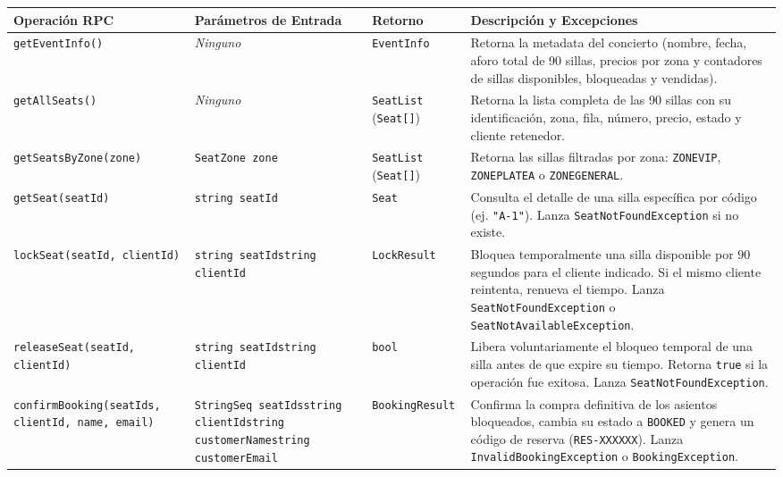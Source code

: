\documentclass[10pt,letterpaper]{article}
\begin{document}
\begin{center}
\scriptsize
\begin{tabularx}{\textwidth}{@{}|l|p{3.2cm}|l|X|@{}}
\hline
\rowcolor{icesiLight}
\textbf{Operación RPC} & \textbf{Parámetros de Entrada} & \textbf{Retorno} & \textbf{Descripción y Excepciones} \\
\hline
\texttt{getEventInfo()} & \textit{Ninguno} & \texttt{EventInfo} & Retorna la metadata del concierto (nombre, fecha, aforo total de 90 sillas, precios por zona y contadores de sillas disponibles, bloqueadas y vendidas). \\
\hline
\texttt{getAllSeats()} & \textit{Ninguno} & \texttt{SeatList} (\texttt{Seat[]}) & Retorna la lista completa de las 90 sillas con su identificación, zona, fila, número, precio, estado y cliente retenedor. \\
\hline
\texttt{getSeatsByZone(zone)} & \texttt{SeatZone zone} & \texttt{SeatList} (\texttt{Seat[]}) & Retorna las sillas filtradas por zona: \texttt{ZONEVIP}, \texttt{ZONEPLATEA} o \texttt{ZONEGENERAL}. \\
\hline
\texttt{getSeat(seatId)} & \texttt{string seatId} & \texttt{Seat} & Consulta el detalle de una silla específica por código (ej. \texttt{"A-1"}). Lanza \texttt{SeatNotFoundException} si no existe. \\
\hline
\texttt{lockSeat(seatId, clientId)} & \texttt{string seatId}\newline\texttt{string clientId} & \texttt{LockResult} & Bloquea temporalmente una silla disponible por 90 segundos para el cliente indicado. Si el mismo cliente reintenta, renueva el tiempo. Lanza \texttt{SeatNotFoundException} o \texttt{SeatNotAvailableException}. \\
\hline
\texttt{releaseSeat(seatId, clientId)} & \texttt{string seatId}\newline\texttt{string clientId} & \texttt{bool} & Libera voluntariamente el bloqueo temporal de una silla antes de que expire su tiempo. Retorna \texttt{true} si la operación fue exitosa. Lanza \texttt{SeatNotFoundException}. \\
\hline
\texttt{confirmBooking(seatIds, clientId, name, email)} & \texttt{StringSeq seatIds}\newline\texttt{string clientId}\newline\texttt{string customerName}\newline\texttt{string customerEmail} & \texttt{BookingResult} & Confirma la compra definitiva de los asientos bloqueados, cambia su estado a \texttt{BOOKED} y genera un código de reserva (\texttt{RES-XXXXXX}). Lanza \texttt{InvalidBookingException} o \texttt{BookingException}. \\

\end{tabularx}
\end{center}
\end{document}
